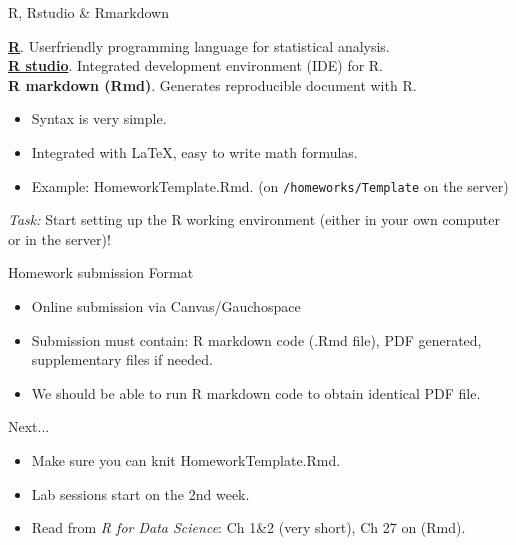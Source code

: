 \documentclass[10pt]{beamer}
\begin{document}
\begin{frame}{R, Rstudio \& Rmarkdown}

\large
\href{https://cloud.r-project.org}{\bf R}. User\-friendly programming language for statistical analysis.\\
\href{http://www.rstudio.com/download}{\bf R studio}. Integrated development environment (IDE) for R.\\
 {\bf R markdown (Rmd)}. Generates reproducible document with R.

 \begin{itemize}
     \item Syntax is very simple.
     \item Integrated with LaTeX, easy to write math formulas.
     \item Example: HomeworkTemplate.Rmd. (on \texttt{/homeworks/Template} on the server)
 \end{itemize}
 {\em Task: } Start setting up the R working environment (either in your own computer or in the server)!
\end{frame}

\begin{frame}{Homework submission Format}
\large
\begin{itemize}
    \item Online submission via Canvas/Gauchospace
    \item Submission must contain: R markdown code (.Rmd file), PDF generated, supplementary files if needed.
    \item We should be able to run R markdown code to obtain identical PDF file.
\end{itemize}


    
\end{frame}

\begin{frame}{Next...}
\large
\begin{itemize}
    \item Make sure you can knit HomeworkTemplate.Rmd.
    \item Lab sessions start on the 2nd week.
    \item Read from {\em R for Data Science}: Ch 1\&2 (very short), Ch 27 on (Rmd).
\end{itemize}
    
\end{frame}
\end{document}

